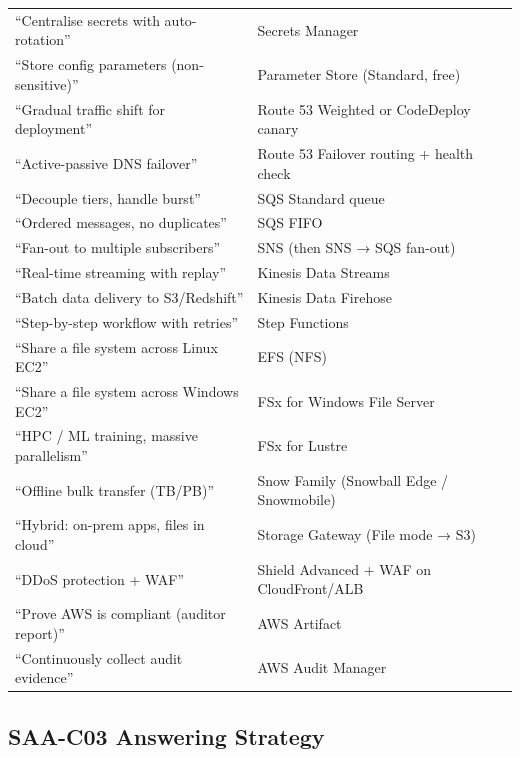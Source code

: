 \begin{comparebox}[title={Scenario keyword → correct answer mapping}]
\begin{tabular}{@{}p{5.5cm}p{6cm}@{}}
``Centralise secrets with auto-rotation'' & Secrets Manager \\[3pt]
``Store config parameters (non-sensitive)'' & Parameter Store (Standard, free) \\[3pt]
``Gradual traffic shift for deployment'' & Route 53 Weighted or CodeDeploy canary \\[3pt]
``Active-passive DNS failover'' & Route 53 Failover routing + health check \\[3pt]
``Decouple tiers, handle burst'' & SQS Standard queue \\[3pt]
``Ordered messages, no duplicates'' & SQS FIFO \\[3pt]
``Fan-out to multiple subscribers'' & SNS (then SNS → SQS fan-out) \\[3pt]
``Real-time streaming with replay'' & Kinesis Data Streams \\[3pt]
``Batch data delivery to S3/Redshift'' & Kinesis Data Firehose \\[3pt]
``Step-by-step workflow with retries'' & Step Functions \\[3pt]
``Share a file system across Linux EC2'' & EFS (NFS) \\[3pt]
``Share a file system across Windows EC2'' & FSx for Windows File Server \\[3pt]
``HPC / ML training, massive parallelism'' & FSx for Lustre \\[3pt]
``Offline bulk transfer (TB/PB)'' & Snow Family (Snowball Edge / Snowmobile) \\[3pt]
``Hybrid: on-prem apps, files in cloud'' & Storage Gateway (File mode → S3) \\[3pt]
``DDoS protection + WAF'' & Shield Advanced + WAF on CloudFront/ALB \\[3pt]
``Prove AWS is compliant (auditor report)'' & AWS Artifact \\[3pt]
``Continuously collect audit evidence'' & AWS Audit Manager \\[3pt]
\bottomrule
\end{tabular}
\end{comparebox}

\subsection{SAA-C03 Answering Strategy}

